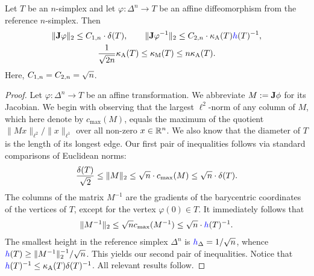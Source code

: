 \documentclass[10pt,a4paper]{article}
\begin{document}
\begin{lemma}\label{lemma:measurerelationships}
    Let $T$ be an $n$-simplex and let $\varphi : \Delta^{n} \rightarrow T$ be an affine diffeomorphism from the reference $n$-simplex. Then 
    \begin{gather*} %
        \matnorm{ \Jacobian \varphi } 
        \leq 
        \Ceins{n} \cdot \diam(T),
        \qquad 
        \matnorm{ \Jacobian \varphi^{-1} } 
        \leq 
        \Czwei{n} \cdot \aspectratio(T) \height(T)^{-1}
        ,
        \\
        \frac{1}{\sqrt{2n}} \aspectratio(T) \leq \algebraicshapemeasure(T) \leq n \aspectratio(T).
    \end{gather*}
    Here, $C_{1,n} = C_{2,n} = \sqrt n$. 
\end{lemma}
\begin{proof}
    Let $\varphi : \Delta^{n} \rightarrow T$ be an affine transformation. 
    We abbreviate $M := {\mathbf{J}}\phi$ for its Jacobian. 
    We begin with observing that the largest $\ell^{2}$-norm of any column of $M$,
    which here denote by $c_{\max}(M)$, 
    equals the maximum of the quotient $\| M x \|_{\ell^{2}} / \| x \|_{\ell^{1}}$ over all non-zero $x \in {\mathbb R}^{n}$. 
    We also know that the diameter of $T$ is the length of its longest edge. 
    Our first pair of inequalities follows via standard comparisons of Euclidean norms:
    \begin{align*}
        \frac{{\delta}(T)}{\sqrt 2} \leq \|  M  \|_{2} \leq \sqrt{n} \cdot c_{\max}(M) \leq \sqrt{n} \cdot {\delta}(T).
    \end{align*}
    The columns of the matrix $M^{-1}$ are the gradients of the barycentric coordinates of the vertices of $T$,
    except for the vertex $\varphi(0) \in T$. It immediately follows that 
    \begin{align*}
        \matnorm{ M^{-1} } \leq \sqrt{n} c_{\max}(M^{-1}) \leq \sqrt{n} \cdot \height(T)^{-1}
        .
    \end{align*}
    The smallest height in the reference simplex $\Delta^{n}$ is $\height_{\Delta} = 1/\sqrt{n}$, 
    whence $\height(T) \geq \matnorm{M^{-1}}^{-1} / \sqrt{n}$. This yields our second pair of inequalities. 
    Notice that $\height(T)^{-1} \leq \aspectratio(T) \diam(T)^{-1}$.
    All relevant results follow.
\end{proof}
\end{document}
